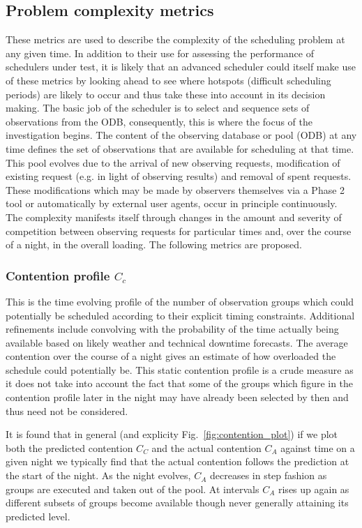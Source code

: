 \subsection{Problem complexity metrics}
\label{ss:pcm}
These metrics are used to describe the complexity of the scheduling problem at any given time. In addition to their use for assessing the performance of schedulers under test, it is likely that an advanced scheduler could itself make use of these metrics by looking ahead to see where hotspots (difficult scheduling periods) are likely to occur and thus take these into account in its decision making.
 The basic job of the scheduler is to select and sequence sets of observations from the ODB, consequently, this is where the focus of the investigation begins. The content of the observing database or pool (ODB) at any time defines the set of observations that are available for scheduling at that time. This pool evolves due to the arrival of new observing requests, modification of existing request (e.g. in light of observing results) and removal of spent requests. These modifications which may be made by observers themselves via a Phase 2 tool or automatically by external user agents, occur in principle continuously. The complexity manifests itself through changes in the amount and severity of competition between observing requests for particular times and, over the course of a night, in the overall loading. The following metrics are proposed.


\subsubsection{Contention profile $C_c$}
 This is the time evolving profile of the number of observation groups which could potentially be scheduled according to their explicit timing constraints. Additional refinements include convolving with the probability of the time actually being available based on likely weather and technical downtime forecasts. The average contention over the course of a night gives an estimate of how overloaded the schedule could potentially be. This static contention profile is a crude measure as it does not take into account the fact that some of the groups which figure in the contention profile later in the night may have already been selected by then and thus need not be considered. 

It is found that in general (and explicity Fig.~\ref{fig:contention_plot}) if we plot both the predicted contention $C_C$ and the actual contention $C_A$ against time on a given night we typically find that the actual contention follows the prediction at the start of the night. As the night evolves, $C_A$ decreases in step fashion as groups are executed and taken out of the pool. At intervals $C_A$ rises up again as different subsets of groups become available though never generally attaining its predicted level. 

